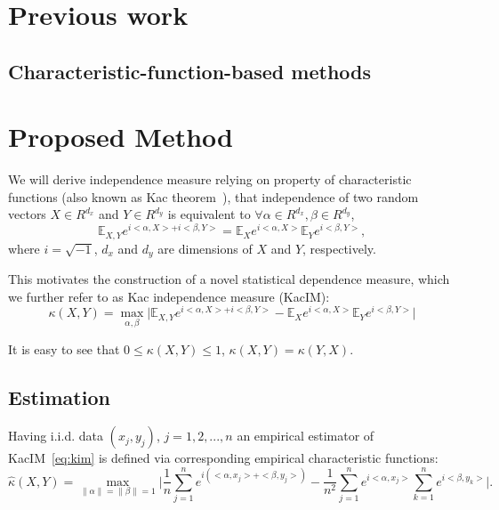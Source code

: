 \documentclass{article}
\begin{document}
\section{Previous work}
\label{section:previous_work}
\subsection{Characteristic-function-based methods}
\label{section:previous_work_cf}
\cite{Feuerverger}
\section{Proposed Method}
\label{section:proposed_method}
We will derive independence measure relying on property of characteristic functions (also known as Kac theorem~\cite{KacTheorem}), that independence of two random vectors $X \in R^{d_{x}}$ and $Y \in R^{d_{y}}$ is equivalent to $\forall \alpha \in R^{d_x}, \beta \in R^{d_y} $, \begin{equation}
\mathbb{E}_{X,Y} e^{i <\alpha, X> + i <\beta, Y>} = \mathbb{E}_{X} e^{i <\alpha, X>} \mathbb{E}_{Y} e^{i <\beta, Y>},
\end{equation}
where $i = \sqrt{-1}$, $d_{x}$ and $d_{y}$ are dimensions of $X$ and $Y$, respectively.

\noindent This motivates the construction of a novel statistical dependence measure, which we further refer to as Kac independence measure (KacIM):
\begin{equation}
\label{eq:kim}
    \kappa(X,Y) = \max_{\alpha, \beta} \vert \mathbb{E}_{X,Y} e^{i <\alpha, X> + i <\beta, Y>} -\mathbb{E}_{X} e^{i <\alpha, X>} \mathbb{E}_{Y} e^{i <\beta, Y>} \vert
\end{equation}

\noindent It is easy to see that $0 \leq \kappa(X,Y) \leq 1$, $\kappa(X,Y) = \kappa(Y,X)$. 

\subsection{Estimation}

Having i.i.d. data $(x_{j}, y_{j})$, $j = 1,2,...,n$ an empirical estimator of KacIM~\eqref{eq:kim} is defined via corresponding empirical characteristic functions:
\begin{equation}
\label{eq:estimator}
    \hat{\kappa}(X,Y) = \max_{\|\alpha\| = \|\beta\| = 1} \vert \frac{1}{n} \sum_{j=1}^{n} e^{i(<\alpha, x_{j}> + <\beta, y_{j}>) } - \frac{1}{n^2} \sum_{j=1}^{n} e^{i <\alpha, x_{j}>}\sum_{k=1}^{n} e^{i<\beta, y_{k}>}\vert.
\end{equation}
\end{document}
